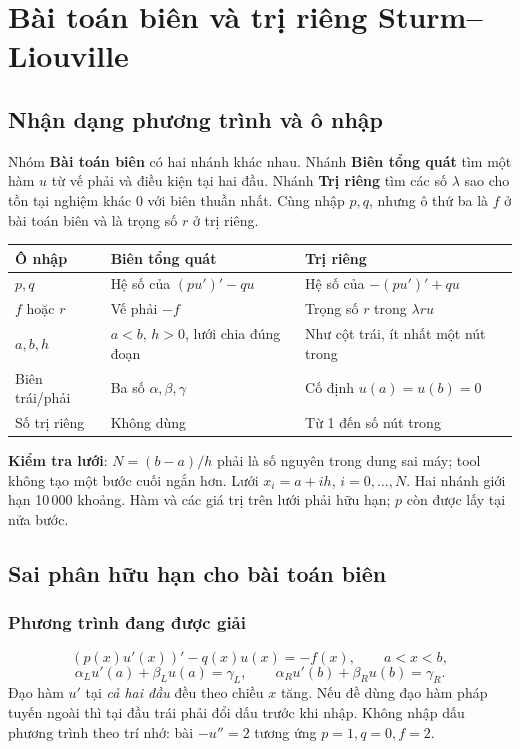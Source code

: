 \chapter{Bài toán biên và trị riêng Sturm--Liouville}
\label{ch:bvp}


\section{Nhận dạng phương trình và ô nhập}
Nhóm \textbf{Bài toán biên} có hai nhánh khác nhau. Nhánh \textbf{Biên tổng quát} tìm một hàm $u$ từ vế phải và điều kiện tại hai đầu. Nhánh \textbf{Trị riêng} tìm các số $\lambda$ sao cho tồn tại nghiệm khác 0 với biên thuần nhất. Cùng nhập $p,q$, nhưng ô thứ ba là $f$ ở bài toán biên và là trọng số $r$ ở trị riêng.

\begin{center}\small
\begin{tabular}{@{}p{.20\linewidth}p{.35\linewidth}p{.35\linewidth}@{}}\toprule
Ô nhập & Biên tổng quát & Trị riêng\\\midrule
$p,q$ & Hệ số của $(pu')'-qu$ & Hệ số của $-(pu')'+qu$\\
$f$ hoặc $r$ & Vế phải $-f$ & Trọng số $r$ trong $\lambda r u$\\
$a,b,h$ & $a<b$, $h>0$, lưới chia đúng đoạn & Như cột trái, ít nhất một nút trong\\
Biên trái/phải & Ba số $\alpha,\beta,\gamma$ & Cố định $u(a)=u(b)=0$\\
Số trị riêng & Không dùng & Từ 1 đến số nút trong\\\bottomrule
\end{tabular}\end{center}

\textbf{Kiểm tra lưới}: $N=(b-a)/h$ phải là số nguyên trong dung sai máy; tool không tạo một bước cuối ngắn hơn. Lưới $x_i=a+ih$, $i=0,\ldots,N$. Hai nhánh giới hạn 10\,000 khoảng. Hàm và các giá trị trên lưới phải hữu hạn; $p$ còn được lấy tại nửa bước.

\section{Sai phân hữu hạn cho bài toán biên}
\subsection{Phương trình đang được giải}
\[
 (p(x)u'(x))'-q(x)u(x)=-f(x),\qquad a<x<b,
\]
\[
 \alpha_Lu'(a)+\beta_Lu(a)=\gamma_L,\qquad
 \alpha_Ru'(b)+\beta_Ru(b)=\gamma_R.
\]
Đạo hàm $u'$ tại \emph{cả hai đầu} đều theo chiều $x$ tăng. Nếu đề dùng đạo hàm pháp tuyến ngoài thì tại đầu trái phải đổi dấu trước khi nhập. Không nhập dấu phương trình theo trí nhớ: bài $-u''=2$ tương ứng $p=1,q=0,f=2$.

